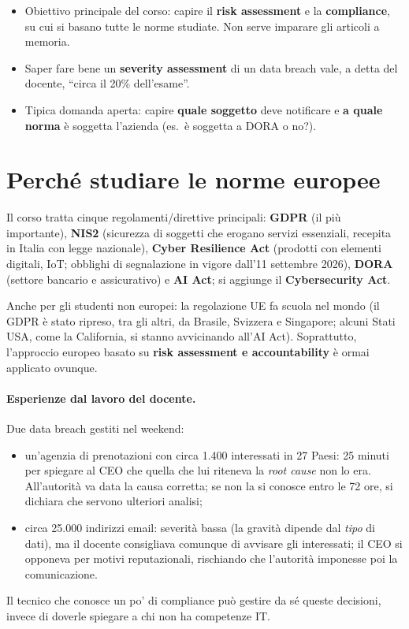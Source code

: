 \begin{esame}
\begin{itemize}
  \item Obiettivo principale del corso: capire il \textbf{risk assessment} e la \textbf{compliance},
    su cui si basano tutte le norme studiate. Non serve imparare gli articoli a memoria.
  \item Saper fare bene un \textbf{severity assessment} di un data breach vale, a detta del docente,
    ``circa il 20\% dell'esame''.
  \item Tipica domanda aperta: capire \textbf{quale soggetto} deve notificare e \textbf{a quale norma}
    è soggetta l'azienda (es.\ è soggetta a DORA o no?).
\end{itemize}
\end{esame}

\section{Perché studiare le norme europee}
Il corso tratta cinque regolamenti/direttive principali: \textbf{GDPR} (il più importante),
\textbf{NIS2} (sicurezza di soggetti che erogano servizi essenziali, recepita in Italia con legge
nazionale), \textbf{Cyber Resilience Act} (prodotti con elementi digitali, IoT; obblighi di
segnalazione in vigore dall'11 settembre 2026), \textbf{DORA} (settore bancario e assicurativo) e
\textbf{AI Act}; si aggiunge il \textbf{Cybersecurity Act}.

Anche per gli studenti non europei: la regolazione UE fa scuola nel mondo (il GDPR è stato ripreso,
tra gli altri, da Brasile, Svizzera e Singapore; alcuni Stati USA, come la California, si stanno
avvicinando all'AI Act). Soprattutto, l'approccio europeo basato su \textbf{risk assessment e
accountability} è ormai applicato ovunque.

\paragraph{Esperienze dal lavoro del docente.} Due data breach gestiti nel weekend:
\begin{itemize}
  \item un'agenzia di prenotazioni con circa 1.400 interessati in 27 Paesi: 25 minuti per spiegare al
    CEO che quella che lui riteneva la \emph{root cause} non lo era. All'autorità va data la causa
    corretta; se non la si conosce entro le 72 ore, si dichiara che servono ulteriori analisi;
  \item circa 25.000 indirizzi email: severità bassa (la gravità dipende dal \emph{tipo} di dati), ma
    il docente consigliava comunque di avvisare gli interessati; il CEO si opponeva per motivi
    reputazionali, rischiando che l'autorità imponesse poi la comunicazione.
\end{itemize}
Il tecnico che conosce un po' di compliance può gestire da sé queste decisioni, invece di doverle
spiegare a chi non ha competenze IT.

